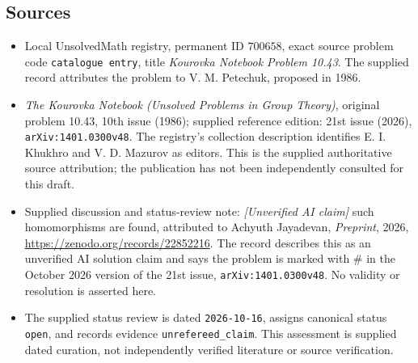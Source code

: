 \documentclass[11pt]{article}
\begin{document}
\subsection{Sources}
\begin{itemize}
\item Local UnsolvedMath registry, permanent ID \(700658\), exact source problem code \texttt{catalogue entry}, title \emph{Kourovka Notebook Problem 10.43}. The supplied record attributes the problem to V. M. Petechuk, proposed in 1986.
\item \emph{The Kourovka Notebook (Unsolved Problems in Group Theory)}, original problem 10.43, 10th issue (1986); supplied reference edition: 21st issue (2026), \texttt{arXiv:1401.0300v48}. The registry's collection description identifies E. I. Khukhro and V. D. Mazurov as editors. This is the supplied authoritative source attribution; the publication has not been independently consulted for this draft.
\item Supplied discussion and status-review note: \emph{[Unverified AI claim]} such homomorphisms are found, attributed to Achyuth Jayadevan, \emph{Preprint}, 2026, \url{https://zenodo.org/records/22852216}. The record describes this as an unverified AI solution claim and says the problem is marked with \(\#\) in the October 2026 version of the 21st issue, \texttt{arXiv:1401.0300v48}. No validity or resolution is asserted here.
\item The supplied status review is dated \texttt{2026-10-16}, assigns canonical status \texttt{open}, and records evidence \texttt{unrefereed\_claim}. This assessment is supplied dated curation, not independently verified literature or source verification.
\end{itemize}
\end{document}
